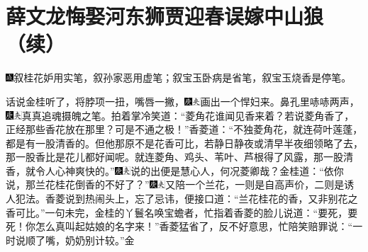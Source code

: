 
\chapter{薛文龙悔娶河东狮\hspace{.5em}贾迎春误嫁中山狼（续）}

{\includegraphics[width=3mm]{../Images/00005}\kaishu 叙桂花妒用实笔，叙孙家恶用虚笔；叙宝玉卧病是省笔，叙宝玉烧香是停笔。}

话说金桂听了，将脖项一扭，嘴唇一撇，{\includegraphics[width=3mm]{../Images/00004}\includegraphics[width=3mm]{../Images/00012}\footnotesize \kaishu 画出一个悍妇来。}鼻孔里哧哧两声，{\includegraphics[width=3mm]{../Images/00004}\includegraphics[width=3mm]{../Images/00012}\footnotesize \kaishu 真真追魂摄魄之笔。}拍着掌冷笑道：``菱角花谁闻见香来着？若说菱角香了，正经那些香花放在那里？可是不通之极！''香菱道：``不独菱角花，就连荷叶莲蓬，都是有一股清香的。但他那原不是花香可比，若静日静夜或清早半夜细领略了去，那一股香比是花儿都好闻呢。就连菱角、鸡头、苇叶、芦根得了风露，那一股清香，就令人心神爽快的。''{\includegraphics[width=3mm]{../Images/00004}\includegraphics[width=3mm]{../Images/00012}\footnotesize \kaishu 说的出便是慧心人，何况菱卿哉？}金桂道：``依你说，那兰花桂花倒香的不好了？''{\includegraphics[width=3mm]{../Images/00004}\includegraphics[width=3mm]{../Images/00012}\footnotesize \kaishu 又陪一个兰花，一则是自高声价，二则是诱人犯法。}香菱说到热闹头上，忘了忌讳，便接口道：``兰花桂花的香，又非别花之香可比。''一句未完，金桂的丫鬟名唤宝蟾者，忙指着香菱的脸儿说道：``要死，要死！你怎么真叫起姑娘的名字来！''香菱猛省了，反不好意思，忙陪笑赔罪说：``一时说顺了嘴，奶奶别计较。''金